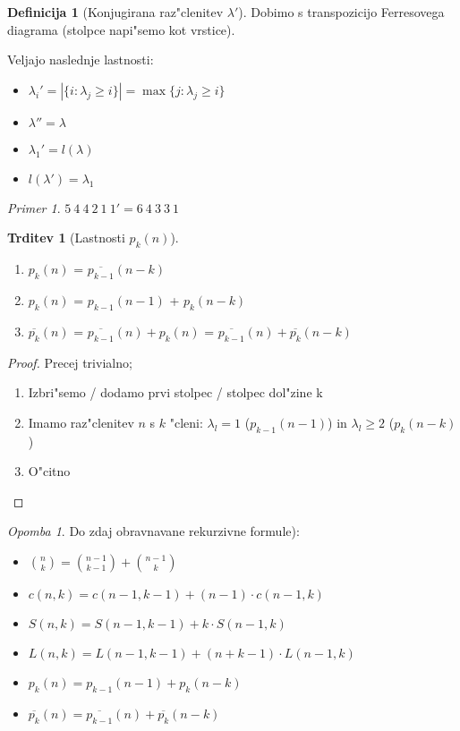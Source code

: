 \documentclass[a4paper,12pt]{article}
\theoremstyle{definition}
\newtheorem{defn}[counter]{Definicija}
\newtheorem{claim}[counter]{Trditev}
\theoremstyle{remark}
\newtheorem*{ex}{Primer}
\newtheorem*{rem}{Opomba}
\begin{document}
\begin{defn} [Konjugirana raz"clenitev $\lambda '$]
	Dobimo s transpozicijo Ferresovega diagrama (stolpce napi"semo kot vrstice).
\end{defn}
Veljajo naslednje lastnosti:
\begin{itemize}
	\item $\lambda_i ' = |\{i: \lambda_j \geqslant i\}| = \max\{j: \lambda_j \geqslant i\}$
	\item $\lambda '' = \lambda$
	\item $\lambda_1 ' = l(\lambda)$
	\item $l(\lambda ') = \lambda_1$
\end{itemize}
\begin{ex}
	$5 \ 4 \ 4 \ 2 \ 1 \ 1 ' = 6 \ 4 \ 3 \ 3 \ 1$
\end{ex}

\begin{claim}[Lastnosti $p_k(n)$]\mbox{}
	\begin{enumerate}
	    \item $p_k(n)$ = $\overline{p_{k - 1}} (n - k)$
	    \item $p_k(n)$ = $p_{k - 1} (n - 1)$ + $p_k (n - k)$
	    \item $\overline{p_{k}}(n)$ = $\overline{p_{k - 1}}(n) + p_k (n)$ = $\overline{p_{k - 1}}(n) + \overline{p_k} (n - k)$ 
	\end{enumerate}
\end{claim}

\begin{proof}
	Precej trivialno;
    \begin{enumerate}
        \item Izbri"semo / dodamo prvi stolpec / stolpec dol"zine k
        \item Imamo raz"clenitev $n$ s $k$ "cleni: $\lambda_l = 1$ ($p_{k - 1}(n - 1)$) in $\lambda_l \geqslant 2$ ($p_k(n - k)$)
        \item O"citno
    \end{enumerate}
\end{proof}

\begin{rem}
	Do zdaj obravnavane rekurzivne formule):\\
	\begin{itemize}
	    \item $\binom{n}{k} = \binom{n - 1}{k - 1} + \binom{n - 1}{k}$
	    \item $c(n, k) = c(n - 1, k - 1) + (n - 1)\cdot c(n - 1, k)$
	    \item $S(n, k) = S(n - 1, k - 1) + k\cdot S(n - 1, k)$
	    \item $L(n, k) = L(n - 1, k - 1) + (n + k - 1)\cdot L(n - 1, k)$
	    \item $p_k(n) = p_{k - 1}(n - 1) + p_k (n - k)$
	    \item $\overline{p_k}(n) = \overline{p_{k - 1}}(n) + \overline{p_k}(n - k)$
	\end{itemize}
\end{rem}
\end{document}

